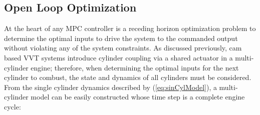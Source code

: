 \subsection{Open Loop Optimization}
\label{sec:optimization}
At the heart of any MPC controller is a receding horizon optimization problem to determine the optimal inputs to drive the system to the commanded output without violating any of the system constraints. As discussed previously, cam based VVT systems introduce cylinder coupling via a shared actuator in a multi-cylinder engine; therefore, when determining the optimal inputs for the next cylinder to combust, the state and dynamics of all cylinders must be considered. From the single cylinder dynamics described by (\ref{eq:sinCylModel}), a multi-cylinder model can be easily constructed whose time step is a complete engine cycle:
